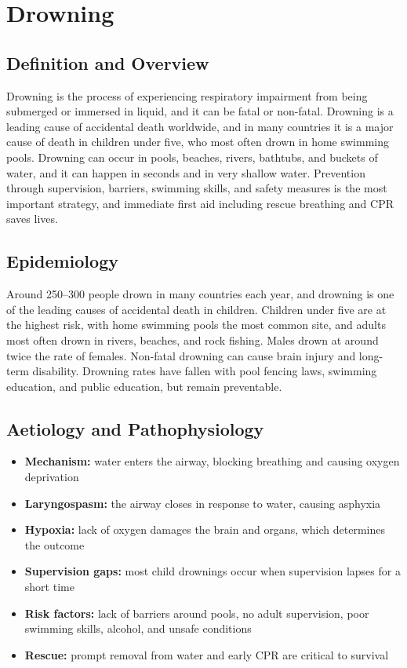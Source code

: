\chapter{Drowning}

\section*{Definition and Overview}
Drowning is the process of experiencing respiratory impairment from being submerged or immersed in liquid, and it can be fatal or non-fatal. Drowning is a leading cause of accidental death worldwide, and in many countries it is a major cause of death in children under five, who most often drown in home swimming pools. Drowning can occur in pools, beaches, rivers, bathtubs, and buckets of water, and it can happen in seconds and in very shallow water. Prevention through supervision, barriers, swimming skills, and safety measures is the most important strategy, and immediate first aid including rescue breathing and CPR saves lives.

\section*{Epidemiology}
Around 250--300 people drown in many countries each year, and drowning is one of the leading causes of accidental death in children. Children under five are at the highest risk, with home swimming pools the most common site, and adults most often drown in rivers, beaches, and rock fishing. Males drown at around twice the rate of females. Non-fatal drowning can cause brain injury and long-term disability. Drowning rates have fallen with pool fencing laws, swimming education, and public education, but remain preventable.

\section*{Aetiology and Pathophysiology}
\begin{itemize}
    \item \textbf{Mechanism:} water enters the airway, blocking breathing and causing oxygen deprivation
    \item \textbf{Laryngospasm:} the airway closes in response to water, causing asphyxia
    \item \textbf{Hypoxia:} lack of oxygen damages the brain and organs, which determines the outcome
    \item \textbf{Supervision gaps:} most child drownings occur when supervision lapses for a short time
    \item \textbf{Risk factors:} lack of barriers around pools, no adult supervision, poor swimming skills, alcohol, and unsafe conditions
    \item \textbf{Rescue:} prompt removal from water and early CPR are critical to survival
\end{itemize}

